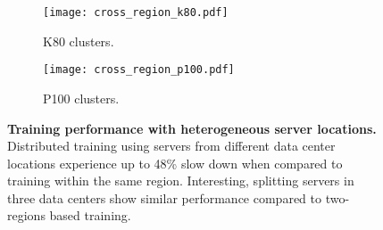 \begin{figure}[t]
%
    \begin{subfigure}{0.24\textwidth}
    \centering
    \texttt{[image: cross\_region\_k80.pdf]}
        \caption{K80 clusters.}
    \label{subfig:heter_k80} 
    \end{subfigure}
\hfill
    \begin{subfigure}{0.24\textwidth}
    \centering
    \texttt{[image: cross\_region\_p100.pdf]}
        \caption{P100 clusters.}
    \label{subfig:heter_p100} 
    \end{subfigure}
    \caption{\textbf{Training performance with heterogeneous server locations.}
    Distributed training using servers from different data center locations experience up to 48\% slow down when compared to training within the same region. 
    Interesting, splitting servers in three data centers show similar performance compared to two-regions based training.}  
    \label{fig:cross_region_train}
\end{figure}





